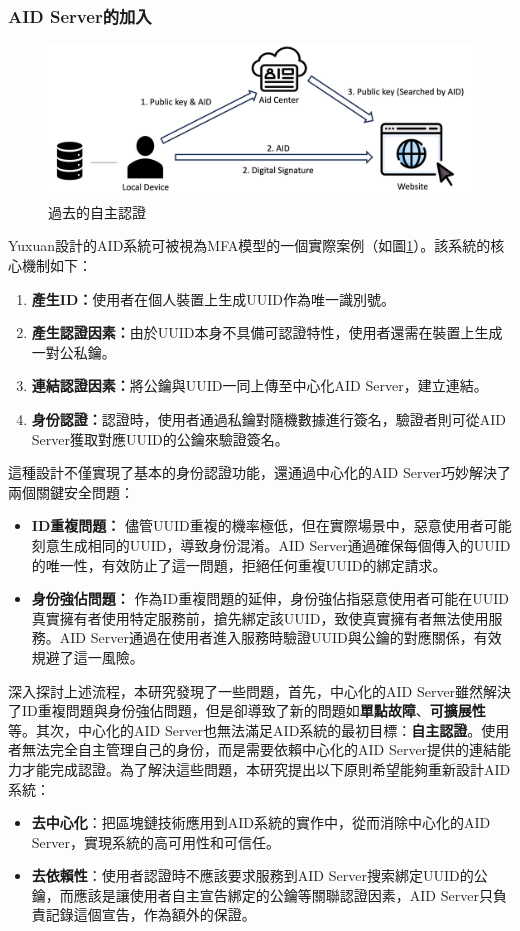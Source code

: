 \subsubsection{AID Server的加入}
\begin{figure}
  \centering
  \includegraphics[width=\linewidth]{figures/old-aid-login.png}
  \caption{過去的自主認證}
  \label{fig:old-aid-login}
\end{figure}
Yuxuan設計的AID系統\cite{ntu-lin2014autonomous}可被視為MFA模型的一個實際案例（如圖\ref{fig:old-aid-login}）。該系統的核心機制如下：
\begin{enumerate}
  \item \textbf{產生ID：}使用者在個人裝置上生成UUID\cite{uuid}作為唯一識別號。
  \item \textbf{產生認證因素：}由於UUID本身不具備可認證特性，使用者還需在裝置上生成一對公私鑰。
  \item \textbf{連結認證因素：}將公鑰與UUID一同上傳至中心化AID Server，建立連結。
  \item \textbf{身份認證：}認證時，使用者通過私鑰對隨機數據進行簽名，驗證者則可從AID Server獲取對應UUID的公鑰來驗證簽名。
\end{enumerate}
這種設計不僅實現了基本的身份認證功能，還通過中心化的AID Server巧妙解決了兩個關鍵安全問題：
\begin{itemize}
  \item \textbf{ID重複問題：} 儘管UUID重複的機率極低，但在實際場景中，惡意使用者可能刻意生成相同的UUID，導致身份混淆。AID Server通過確保每個傳入的UUID的唯一性，有效防止了這一問題，拒絕任何重複UUID的綁定請求。
  \item \textbf{身份強佔問題：} 作為ID重複問題的延伸，身份強佔指惡意使用者可能在UUID真實擁有者使用特定服務前，搶先綁定該UUID，致使真實擁有者無法使用服務。AID Server通過在使用者進入服務時驗證UUID與公鑰的對應關係，有效規避了這一風險。
\end{itemize}

深入探討上述流程，本研究發現了一些問題，首先，中心化的AID Server雖然解決了ID重複問題與身份強佔問題，但是卻導致了新的問題如\textbf{單點故障}、\textbf{可擴展性}等。其次，中心化的AID Server也無法滿足AID系統的最初目標：\textbf{自主認證}。使用者無法完全自主管理自己的身份，而是需要依賴中心化的AID Server提供的連結能力才能完成認證。為了解決這些問題，本研究提出以下原則希望能夠重新設計AID系統：
\begin{itemize}
  \item \textbf{去中心化}：把區塊鏈技術應用到AID系統的實作中，從而消除中心化的AID Server，實現系統的高可用性和可信任。
  \item \textbf{去依賴性}：使用者認證時不應該要求服務到AID Server搜索綁定UUID的公鑰，而應該是讓使用者自主宣告綁定的公鑰等關聯認證因素，AID Server只負責記錄這個宣告，作為額外的保證。
\end{itemize}
